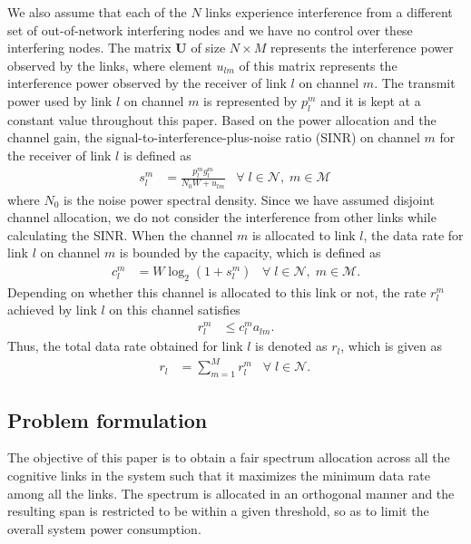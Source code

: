\documentclass[conference]{IEEEtran}
\begin{document}
We also assume that each of the $N$ links  experience  interference from  a different set of out-of-network interfering nodes and we have no control over these interfering nodes. The matrix $\textbf{U}$ of size $N\times M$ represents the interference power observed by the links, where element $u_{lm}$ of this matrix represents the interference power observed by the receiver of link $l$ on channel $m$.
The transmit power used by link $l$ on channel $m$ is represented by $p_l^m$ and it is  kept at a constant value throughout this paper. Based on the power allocation and the channel gain, the signal-to-interference-plus-noise ratio (SINR) on channel $m$ for the receiver of link $l$ is defined as 
\begin{align}
  s_{l}^m &= \frac{p_{l}^m g_{l}^m}{N_0 W+u_{lm}}\;\;\; \forall\; l \in \mathcal{N},\; m \in \mathcal{M}\, \end{align}
where $N_0$ is the noise power spectral density. Since we have assumed disjoint channel allocation, we do not consider the interference from other links while calculating the SINR. When the channel $m$ is allocated to link $l$, the data rate for link $l$ on channel $m$ is bounded by the capacity, which is defined as
\begin{align}
  c_{l}^m &= W \log_2 (1+s_{l}^m) \;\;\; \forall\; l \in \mathcal{N},\; m \in \mathcal{M}. \end{align}
Depending on whether this channel is allocated to this link or not, the rate $r_l^m$ achieved by link $l$ on this channel satisfies
\begin{align}
  r_{l}^m &\leq c_{l}^m a_{lm}. \end{align}
Thus, the total data rate obtained for link $l$ is denoted as $r_l$, which is given as 
\begin{align}
  r_l &= \sum_{m=1}^M r_{l}^m\;\;\; \forall\; l \in \mathcal{N}.\, \end{align}







\subsection{Problem formulation} 
\label{sec:problem}
The objective of this paper is to obtain a fair spectrum allocation across all the cognitive links in the system such that it maximizes the minimum data rate among all the links. The spectrum is allocated in an orthogonal manner and the resulting span is restricted to be within a given threshold, so as to limit the overall system power consumption.
\end{document}
